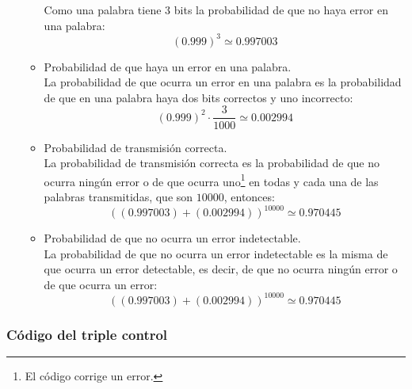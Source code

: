 \begin{enumerate}
\begin{itemize}
Como una palabra tiene $3$ bits la probabilidad de que no haya error en una
palabra:
$$(0.999)^3\simeq 0.997003$$
\item Probabilidad de que haya un error en una palabra.\\

La probabilidad de que ocurra un error en una palabra es la probabilidad de
que en una palabra haya dos bits correctos y uno incorrecto:
$$(0.999)^2\cdot \frac{3}{1000}\simeq 0.002994$$
\item Probabilidad de transmisi\'on correcta.\\

La probabilidad de transmisi\'on correcta es la probabilidad de que no ocurra
ning\'un error o de que ocurra uno\footnote{El c\'odigo corrige un error.} en
todas y cada una de las palabras transmitidas, que son $10000$, entonces:
$$((0.997003)+(0.002994))^{10000}\simeq 0.970445$$
\item Probabilidad de que no ocurra un error indetectable.\\

La probabilidad de que no ocurra un error indetectable es la misma de que ocurra
un error detectable, es decir, de que no ocurra ning\'un error o de que ocurra
un error:
\begin{displaymath}
((0.997003)+(0.002994))^{10000}\simeq 0.970445
\end{displaymath}
\end{itemize}
\end{enumerate}

\subsubsection{C\'odigo del triple control}

